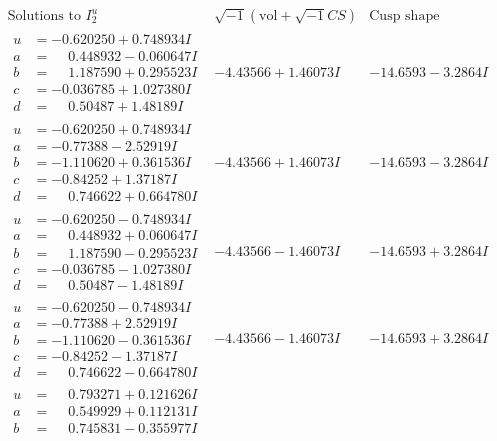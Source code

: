 \documentclass[1p]{elsarticle_modified}
\theoremstyle{definition}
\newcommand{\I}{\sqrt{-1}}
\begin{document}
$$\begin{array}{c|c|c}  
\text{Solutions to }I^u_{2}& \I (\text{vol} + \sqrt{-1}CS) & \text{Cusp shape}\\
 \hline 
\begin{aligned}
u &= -0.620250 + 0.748934 I \\
a &= \phantom{-}0.448932 - 0.060647 I \\
b &= \phantom{-}1.187590 + 0.295523 I \\
c &= -0.036785 + 1.027380 I \\
d &= \phantom{-}0.50487 + 1.48189 I\end{aligned}
 & -4.43566 + 1.46073 I & -14.6593 - 3.2864 I \\ \hline\begin{aligned}
u &= -0.620250 + 0.748934 I \\
a &= -0.77388 - 2.52919 I \\
b &= -1.110620 + 0.361536 I \\
c &= -0.84252 + 1.37187 I \\
d &= \phantom{-}0.746622 + 0.664780 I\end{aligned}
 & -4.43566 + 1.46073 I & -14.6593 - 3.2864 I \\ \hline\begin{aligned}
u &= -0.620250 - 0.748934 I \\
a &= \phantom{-}0.448932 + 0.060647 I \\
b &= \phantom{-}1.187590 - 0.295523 I \\
c &= -0.036785 - 1.027380 I \\
d &= \phantom{-}0.50487 - 1.48189 I\end{aligned}
 & -4.43566 - 1.46073 I & -14.6593 + 3.2864 I \\ \hline\begin{aligned}
u &= -0.620250 - 0.748934 I \\
a &= -0.77388 + 2.52919 I \\
b &= -1.110620 - 0.361536 I \\
c &= -0.84252 - 1.37187 I \\
d &= \phantom{-}0.746622 - 0.664780 I\end{aligned}
 & -4.43566 - 1.46073 I & -14.6593 + 3.2864 I \\ \hline\begin{aligned}
u &= \phantom{-}0.793271 + 0.121626 I \\
a &= \phantom{-}0.549929 + 0.112131 I \\
b &= \phantom{-}0.745831 - 0.355977 I \\

\end{aligned}
\end{array}$$
\end{document}
